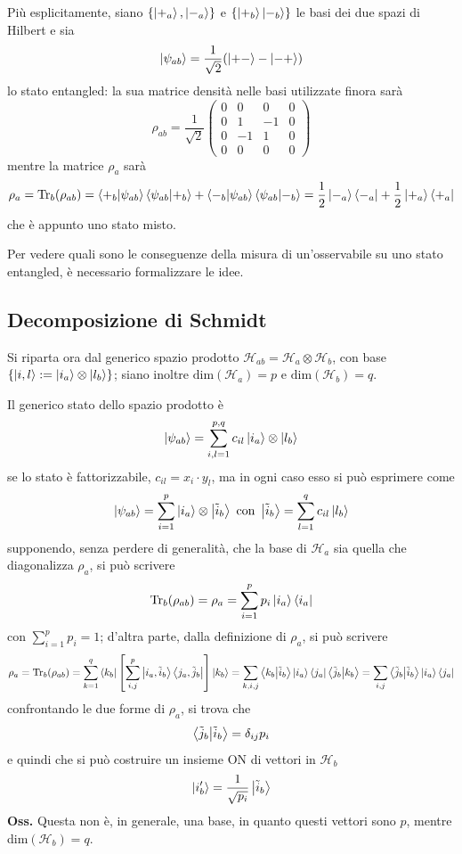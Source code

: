 Più esplicitamente, siano $\left\{\ket{+_a},\ket{-_a}\right\}$ e $\left\{\ket{+_b}\ket{-_b}\right\}$
le basi dei due spazi di Hilbert e sia
$$\ket{\psi_{ab}}=\frac{1}{\sqrt{2}}(\ket{+-}-\ket{-+})$$
lo stato entangled: la sua matrice densità nelle basi utilizzate finora sarà
$$\rho_{ab} = \frac{1}{\sqrt{2}}\begin{pmatrix}
    0&0&0&0\\
    0&1&-1&0\\
    0&-1&1&0\\
    0&0&0&0
\end{pmatrix}
$$
mentre la matrice $\rho_a$ sarà
$$\rho_a = \Tr_b(\rho_{ab}) = \bra{+_b}\ket{\psi_{ab}}\bra{\psi_{ab}}\ket{+_b} +
\bra{-_b}\ket{\psi_{ab}}\bra{\psi_{ab}}\ket{-_b}=
\frac{1}{2}\ket{-_a}\bra{-_a}+\frac{1}{2}\ket{+_a}\bra{+_a}$$
che è appunto uno stato misto.

Per vedere quali sono le conseguenze della misura di un'osservabile su uno stato entangled, è
necessario formalizzare le idee.
\subsection{Decomposizione di Schmidt}
Si riparta ora dal generico spazio prodotto $\mathcal{H}_{ab}=\mathcal{H}_a\otimes\mathcal{H}_b$, con
base $\left\{\ket{i,l}:=\ket{i_a}\otimes\ket{l_b}\right\}$; siano inoltre $\text{dim}(\mathcal{H}_a)=
p$ e $\text{dim}(\mathcal{H}_b)=q$.

Il generico stato dello spazio prodotto è
$$\ket{\psi_{ab}} = \sum_{i,l=1}^{p,q}c_{il}\ket{i_a}\otimes\ket{l_b}$$
se lo stato è fattorizzabile, $c_{il}=x_i\cdot y_l$, ma in ogni caso esso si può esprimere come
$$\ket{\psi_{ab}} = \sum_{i=1}^{p}\ket{i_a}\otimes\ket{\tilde i_b}\text{ con }\ket{\tilde i_b} = 
\sum_{l=1}^{q}c_{il}\ket{l_b}$$
supponendo, senza perdere di generalità, che la base di $\mathcal{H}_a$ sia quella che diagonalizza
$\rho_a$, si può scrivere
$$\Tr_b(\rho_{ab})=\rho_a=\sum_{i=1}^{p}p_i\ket{i_a}\bra{i_a}$$
con $\sum_{i=1}^{p}p_i = 1$; d'altra parte, dalla definizione di $\rho_a$, si può scrivere
$$\rho_a = \Tr_b(\rho_{ab}) =
\sum_{k=1}^{q}\bra{k_b}\left[\sum_{i,j}^{p}\ket{i_a,\tilde i_b}\bra{j_a,\tilde j_b}\right]\ket{k_b}=
\sum_{k,i,j}^{}\bra{k_b}\ket{\tilde i_b}\ket{i_a}\bra{j_a}\bra{\tilde j_b}\ket{k_b} =
\sum_{i,j}^{}\bra{\tilde j_b}\ket{\tilde i_b}\ket{i_a}\bra{j_a}$$
confrontando le due forme di $\rho_a$, si trova che
$$\bra{\tilde j_b}\ket{\tilde i_b} = \delta_{ij}p_i$$
e quindi che si può costruire un insieme ON di vettori in $\mathcal{H}_b$
$$\ket{i'_b} = \frac{1}{\sqrt{p_i}}\ket{\tilde i_b}$$
\textbf{Oss.} Questa non è, in generale, una base, in quanto questi vettori sono $p$, mentre
dim$(\mathcal{H}_b)=q$.

